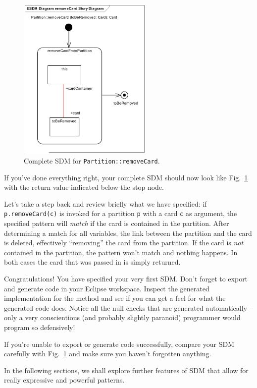 \begin{figure}[htbp]
\begin{center}
  \includegraphics[width=0.58\textwidth]{pics/sdmBilder/removeCard/sdm15}
  \caption{Complete SDM for \texttt{Partition::removeCard}.}  
  \label{fig:sdm_complete_control_flow}
\end{center}
\end{figure}

If you've done everything right, your complete SDM should now look like
Fig.~\ref{fig:sdm_complete_control_flow} with the return value indicated below
the stop node.

Let's take a step back and review briefly what we have specified:  if
\texttt{p.remove\-Card(c)} is invoked for a partition \texttt{p} with a card
\texttt{c} as argument, the specified pattern will \emph{match} if the card is
contained in the partition.  After determining a match for all variables, the
link between the partition and the card is deleted, effectively ``removing'' the
card from the partition.  If the card is \emph{not} contained in the partition,
the pattern won't match and nothing happens. In both cases the card that was
passed in is simply returned.

Congratulations!  You have specified your very first SDM.  Don't forget to
export and generate code in your Eclipse workspace.  Inspect the generated
implementation for the method and see if you can get a feel for what the
generated code does.  Notice all the null checks that are generated
automatically -- only a very conscientious (and probably slightly paranoid)
programmer would program so defensively!

If you're unable to export or generate code successfully, compare your SDM
carefully with Fig.~\ref{fig:sdm_complete_control_flow} and make sure you
haven't forgotten anything.

In the following sections, we shall explore further features of SDM that
allow for really expressive and powerful patterns.
